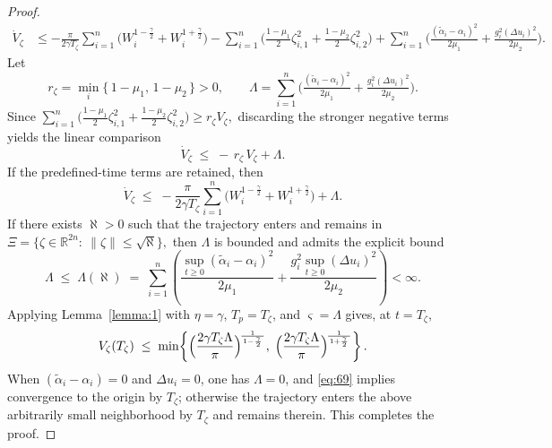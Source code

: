 \documentclass[pdflatex,sn-mathphys-num]{sn-jnl}%
\theoremstyle{thmstyleone}%
\theoremstyle{thmstyletwo}%
\theoremstyle{thmstylethree}%
\begin{document}
\begin{proof}
\begin{equation}
\begin{aligned}
	  \dot V_{\zeta}
	  &\le
	  -\frac{\pi}{2\gamma T_{\zeta}}
	   \sum_{i=1}^{n}\Big( W_i^{1-\frac{\gamma}{2}}+W_i^{1+\frac{\gamma}{2}} \Big)
	  -\sum_{i=1}^{n}\Big(\tfrac{1-\mu_{1}}{2}\zeta_{i,1}^{2}
	  +\tfrac{1-\mu_{2}}{2}\zeta_{i,2}^{2}\Big)
	  +\sum_{i=1}^{n}\Big(
	  \tfrac{(\tilde\alpha_i-\alpha_i)^{2}}{2\mu_{1}}
	  +\tfrac{g_i^{2}(\Delta u_i)^{2}}{2\mu_{2}}\Big).
	\end{aligned}
	\end{equation}
	Let
	\[
	  r_\zeta = \min_{i}\{\,1-\mu_{1},\,1-\mu_{2}\,\}>0,\qquad
	  \Lambda  = \sum_{i=1}^{n}\Big(
	  \tfrac{(\tilde\alpha_i-\alpha_i)^{2}}{2\mu_{1}}
	  +\tfrac{g_i^{2}(\Delta u_i)^{2}}{2\mu_{2}}\Big).
	\]
	Since
	\(
	  \sum_{i=1}^{n}\big(\tfrac{1-\mu_{1}}{2}\zeta_{i,1}^{2}
	  +\tfrac{1-\mu_{2}}{2}\zeta_{i,2}^{2}\big)
	  \ge r_\zeta V_\zeta,
	\)
	discarding the stronger negative terms yields the linear comparison
	\begin{equation}\label{eq:68}
	  \dot V_{\zeta}\;\le\; -\, r_\zeta\, V_\zeta + \Lambda .
	\end{equation}
	If the predefined-time terms are retained, then
	\begin{equation}\label{eq:69}
	  \dot V_{\zeta}
	  \;\le\;
	  -\frac{\pi}{2\gamma T_{\zeta}}
	  \sum_{i=1}^{n}\Big( W_i^{1-\frac{\gamma}{2}}+W_i^{1+\frac{\gamma}{2}} \Big)
	  +\Lambda.
	\end{equation}
	If there exists $\aleph>0$ such that the trajectory enters and remains in
	\(
	  \Xi=\{\zeta\in\mathbb R^{2n}:\ \|\zeta\|\le \sqrt{\aleph}\},
	\)
	then $\Lambda$ is bounded and admits the explicit bound
	\begin{equation}\label{eq:70}
	  \Lambda \;\le\; \Lambda(\aleph)\;=\;
	  \sum_{i=1}^{n}\left(
	  \frac{\sup_{t\ge 0}(\tilde\alpha_i-\alpha_i)^2}{2\mu_{1}}
	  +\frac{g_i^{2}\sup_{t\ge 0}(\Delta u_i)^2}{2\mu_{2}}
	  \right)\!<\infty .
	\end{equation}
	Applying Lemma~\ref{lemma:1} with $\eta=\gamma$, $T_p=T_\zeta$, and $\varsigma=\Lambda$ gives, at $t=T_\zeta$,
	\begin{equation}\label{eq:71}
	  V_\zeta(T_\zeta) \;\le\;
	  \min\!\left\{
		\Bigl(\frac{2\gamma T_{\zeta}\Lambda}{\pi}\Bigr)^{\!\frac{1}{\,1-\frac{\gamma}{2}\,}},
		\;
		\Bigl(\frac{2\gamma T_{\zeta}\Lambda}{\pi}\Bigr)^{\!\frac{1}{\,1+\frac{\gamma}{2}\,}}
	  \right\}.
	\end{equation}
	When $(\tilde\alpha_i-\alpha_i)=0$ and $\Delta u_i=0$, one has $\Lambda=0$, and \cref{eq:69} implies convergence to the origin by $T_\zeta$; otherwise the trajectory enters the above arbitrarily small neighborhood by $T_\zeta$ and remains therein. This completes the proof.
	\end{proof}
	
\end{document}
